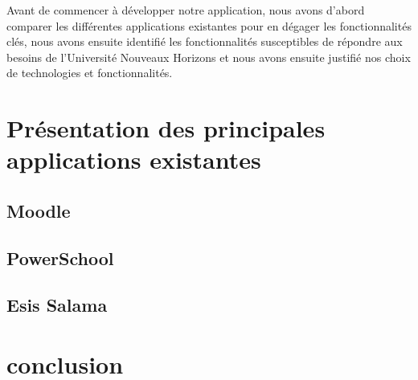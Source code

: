 Avant de commencer à développer notre application, nous avons d'abord
comparer les différentes applications existantes pour en dégager les
fonctionnalités clés, nous avons ensuite identifié les fonctionnalités
susceptibles de répondre aux besoins de l'Université Nouveaux Horizons et nous
avons ensuite justifié nos choix de technologies et fonctionnalités. 

\section{Présentation des principales applications existantes}\label{sec:definitions-et-concepts-cles}


\subsection{Moodle}\label{subsec:moodle}


\subsection{PowerSchool}\label{subsec:powerschool}


\subsection{Esis Salama}\label{subsec:esis-salamae}


\section{conclusion}\label{sec:conclusion}

